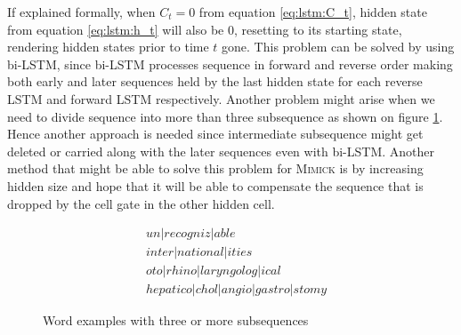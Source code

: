         If explained formally, when $C_t = 0$ from equation
        \ref{eq:lstm:C_t}, hidden state from equation
        \ref{eq:lstm:h_t} will also be $0$, resetting to its starting
        state, rendering hidden states prior to time $t$ gone. This
        problem can be solved by using bi-LSTM, since bi-LSTM processes
        sequence in forward and reverse order making both early and
        later sequences held by the last hidden state for each reverse
        LSTM and forward LSTM respectively. Another problem might
        arise when we need to divide sequence into more than three
        subsequence as shown on figure \ref{fig:subsequence}. Hence
        another approach is needed since intermediate subsequence
        might get deleted or carried along with the later sequences
        even with bi-LSTM. Another method that might be able to solve
        this problem for \textsc{Mimick} is by increasing hidden size
        and hope that it will be able to compensate the sequence that
        is dropped by the cell gate in the other hidden cell.
        \begin{figure}
            \begin{align*}
                &un \vert recogniz \vert able \\
                &inter \vert national \vert ities \\
                &oto \vert rhino \vert laryngolog \vert ical \\
                &hepatico \vert chol \vert angio \vert gastro \vert stomy
            \end{align*}
            \caption{Word examples with three or more subsequences}
            \label{fig:subsequence}
        \end{figure}

